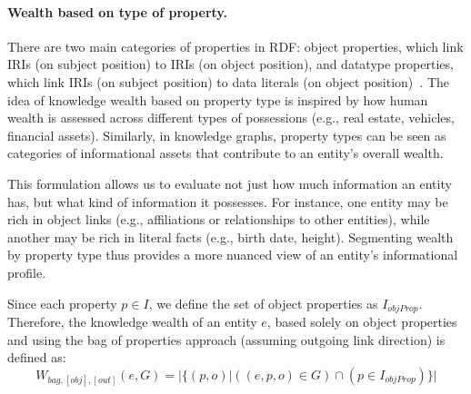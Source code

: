 


\paragraph{Wealth based on type of property.}
There are two main categories of properties in RDF: object properties, which link IRIs (on subject position) to IRIs (on object position), and datatype properties, which link IRIs (on subject position) to data literals (on object position)~\cite{w3crdf}. The idea of knowledge wealth based on property type is inspired by how human wealth is assessed across different types of possessions (e.g., real estate, vehicles, financial assets). Similarly, in knowledge graphs, property types can be seen as categories of informational assets that contribute to an entity's overall wealth.

This formulation allows us to evaluate not just how much information an entity has, but what kind of information it possesses. For instance, one entity may be rich in object links (e.g., affiliations or relationships to other entities), while another may be rich in literal facts (e.g., birth date, height). Segmenting wealth by property type thus provides a more nuanced view of an entity's informational profile.

Since each property \(p \in I\), we define the set of object properties as \(I_{objProp}\). Therefore, the knowledge wealth of an entity \(e\), based solely on object properties and using the bag of properties approach (assuming outgoing link direction) is defined as:
\[
    W_{bag,[obj],[out]}(e,G) = |\{(p,o) | ((e, p, o) \in G) \cap (p \in I_{objProp})\}|
\]

